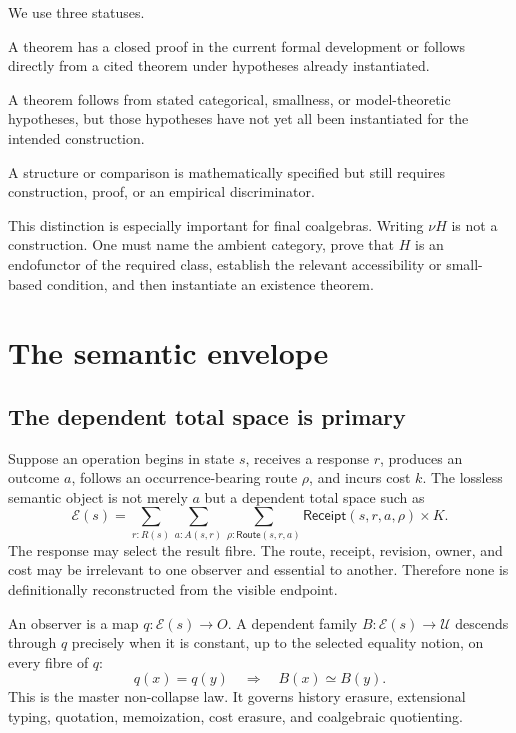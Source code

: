 \documentclass[11pt]{article}
\theoremstyle{definition}
\theoremstyle{remark}
\begin{document}
We use three statuses.

\begin{description}[leftmargin=2.7cm,style=nextline]
\item[Proved.] A theorem has a closed proof in the current formal development or
  follows directly from a cited theorem under hypotheses already instantiated.
\item[Conditional.] A theorem follows from stated categorical, smallness, or
  model-theoretic hypotheses, but those hypotheses have not yet all been
  instantiated for the intended construction.
\item[Design target.] A structure or comparison is mathematically specified but
  still requires construction, proof, or an empirical discriminator.
\end{description}

This distinction is especially important for final coalgebras.  Writing
$\nu H$ is not a construction.  One must name the ambient category, prove that
$H$ is an endofunctor of the required class, establish the relevant accessibility
or small-based condition, and then instantiate an existence theorem.

\section{The semantic envelope}

\subsection{The dependent total space is primary}

Suppose an operation begins in state $s$, receives a response $r$, produces an
outcome $a$, follows an occurrence-bearing route $\rho$, and incurs cost $k$.
The lossless semantic object is not merely $a$ but a dependent total space such
as
\[
  \mathcal{E}(s)
  = \sum_{r:R(s)}\sum_{a:A(s,r)}
    \sum_{\rho:\mathsf{Route}(s,r,a)} \mathsf{Receipt}(s,r,a,\rho)
      \times K.
\]
The response may select the result fibre.  The route, receipt, revision, owner,
and cost may be irrelevant to one observer and essential to another.  Therefore
none is definitionally reconstructed from the visible endpoint.

An observer is a map $q:\mathcal{E}(s)\to O$.  A dependent family
$B:\mathcal{E}(s)\to\mathcal{U}$ descends through $q$ precisely when it is
constant, up to the selected equality notion, on every fibre of $q$:
\[
  q(x)=q(y) \quad\Longrightarrow\quad B(x)\simeq B(y).
\]
This is the master non-collapse law.  It governs history erasure, extensional
typing, quotation, memoization, cost erasure, and coalgebraic quotienting.
\end{document}
